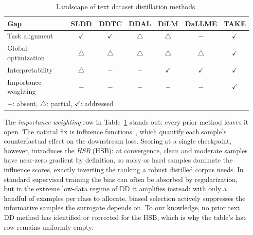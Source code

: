 \begin{table}[ht]
  \centering
  \begin{threeparttable}
    \caption{Landscape of text dataset distillation methods.}
    \label{tab:landscape-textdd-methods}
    \setlength{\tabcolsep}{8pt}
    \begin{tabular}{l c c c c c c}
      \toprule
      \textbf{Gap}         & SLDD         & DDTC         & DDAL         & DiLM         & DaLLME       & \textbf{TAKE} \\
      \midrule
      Task alignment       & $\checkmark$ & $\checkmark$ & $\triangle$  & $\triangle$  & $-$          & $\checkmark$ \\
      Global optimization  & $\triangle$  & $\triangle$  & $\triangle$  & $\triangle$  & $\triangle$  & $\checkmark$ \\
      Interpretability     & $\triangle$  & $-$          & $-$          & $\checkmark$ & $\checkmark$ & $\checkmark$ \\
      Importance weighting & $-$          & $-$          & $-$          & $-$          & $-$          & $\checkmark$ \\
      \bottomrule
      \multicolumn{7}{l}{$-$: absent, $\triangle$: partial, $\checkmark$: addressed}
    \end{tabular}
  \end{threeparttable}
\end{table}

\begin{foldable} %
  The \textit{importance weighting} row in Table~\ref{tab:landscape-textdd-methods} stands out: every prior method leaves it open.
  The natural fix is influence functions~\cite{koh2017understanding}, which quantify each sample's counterfactual effect on the downstream loss.
  Scoring at a single checkpoint, however, introduces the \textit{\acl{HSB}} (\ac{HSB}): at convergence, clean and moderate samples have near-zero gradient by definition, so noisy or hard samples dominate the influence scores, exactly inverting the ranking a robust distilled corpus needs.
  In standard supervised training the bias can often be absorbed by regularization, but in the extreme low-data regime of \ac{DD} it amplifies instead: with only a handful of examples per class to allocate, biased selection actively suppresses the informative samples the surrogate depends on.
  To our knowledge, no prior text \ac{DD} method has identified or corrected for the \ac{HSB}, which is why the table's last row remains uniformly empty.
\end{foldable}

